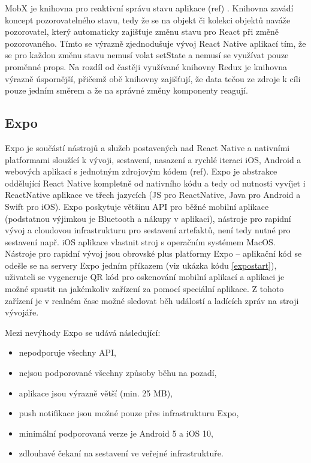 
MobX je knihovna pro reaktivní správu stavu aplikace (ref)
. Knihovna zavádí koncept pozorovatelného stavu, tedy že se na objekt či kolekci objektů naváže pozorovatel, který automaticky zajišťuje změnu stavu pro React při změně pozorovaného. Tímto se výrazně zjednodušuje vývoj React Native aplikací tím, že se pro každou změnu stavu nemusí volat setState a nemusí se využívat pouze proměnné props. Na rozdíl od častěji využívané knihovny Redux je knihovna výrazně úspornější, přičemž obě knihovny zajišťují, že data tečou ze zdroje k cíli pouze jedním směrem a že na správné změny komponenty reagují.

\subsection{Expo}


Expo je součástí nástrojů a služeb postavených nad React Native a nativními platformami sloužící k vývoji, sestavení, nasazení a rychlé iteraci iOS, Android a webových aplikací s jednotným zdrojovým kódem (ref). Expo je abstrakce oddělující React Native kompletně od nativního kódu a tedy od nutnosti vyvíjet i ReactNative aplikace ve třech jazycích (JS pro ReactNative, Java pro Android a Swift pro iOS). Expo poskytuje většinu API pro běžné mobilní aplikace (podstatnou výjimkou je Bluetooth a nákupy v aplikaci), nástroje pro rapidní vývoj a cloudovou infrastrukturu pro sestavení artefaktů, není tedy nutné pro sestavení např. iOS aplikace vlastnit stroj s operačním systémem MacOS. Nástroje pro rapidní vývoj jsou obrovské plus platformy Expo -- aplikační kód se odešle se na servery Expo jedním příkazem (viz ukázka kódu \ref{expostart}), uživateli se vygeneruje QR kód pro oskenování mobilní aplikací a aplikaci je možné spustit na jakémkoliv zařízení za pomocí speciální aplikace. Z tohoto zařízení je v realném čase možné sledovat běh událostí a ladících zpráv na stroji vývojáře. 

Mezi nevýhody Expo se udává následující:

\begin{itemize}
	\item nepodporuje všechny API,
	\item nejsou podporované všechny způsoby běhu na pozadí,
	\item aplikace jsou výrazně větší (min. 25 MB),
	\item push notifikace jsou možné pouze přes infrastrukturu Expo,
	\item minimální podporovaná verze je Android 5 a iOS 10,
	\item zdlouhavé čekaní na sestavení ve veřejné infrastruktuře.
\end{itemize}

